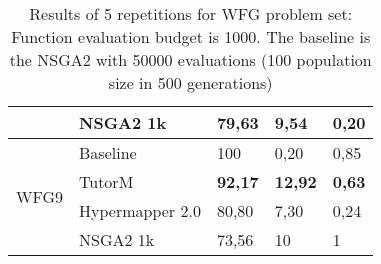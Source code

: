 \begin{table}[]
{\begin{tabular}{@{}lllll@{}}
                          & NSGA2 1k        & 79,63          & 9,54           & 0,20          \\ \midrule
    \multirow{4}{*}{WFG9} & Baseline       & 100            & 0,20           & 0,85          \\ \cmidrule(l){2-5} 
                          & TutorM          & \textbf{92,17} & \textbf{12,92} & \textbf{0,63} \\ \cmidrule(l){2-5} 
                          & Hypermapper 2.0 & 80,80          & 7,30           & 0,24          \\ \cmidrule(l){2-5} 
                          & NSGA2 1k        & 73,56          & 10             & 1             \\ \bottomrule
    \end{tabular}%
    }
    \caption{Results of 5 repetitions for WFG problem set: Function evaluation budget is 1000.
    The baseline is the NSGA2 with 50000 evaluations (100 population size in 500 generations)}
    \label{tab:wfg_summary}
    \end{table}